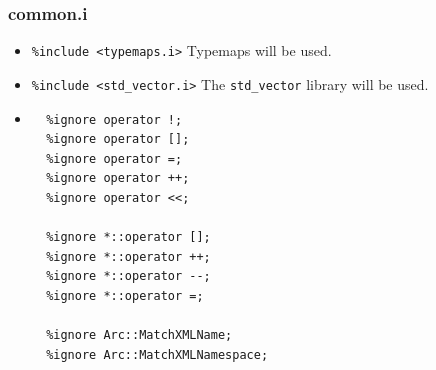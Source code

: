 \documentclass{article}
\begin{document}
\subsubsection{common.i}
\label{icommon}
\begin{flushleft}
\begin{itemize}
  \item{ \verb$%include <typemaps.i>$} \linebreak
  Typemaps will be used. 
\end{itemize}
\begin{itemize}
  \item{ \verb$%include <std_vector.i>$} \linebreak
  The \verb$std_vector$ library will be used.
\end{itemize}
\begin{itemize}
  \item{\begin{verbatim}
  %ignore operator !;
  %ignore operator [];
  %ignore operator =;
  %ignore operator ++;
  %ignore operator <<;

  %ignore *::operator [];
  %ignore *::operator ++;
  %ignore *::operator --;
  %ignore *::operator =;

  %ignore Arc::MatchXMLName;
  %ignore Arc::MatchXMLNamespace;


\end{verbatim}}
\end{itemize}
\end{flushleft}
\end{document}

